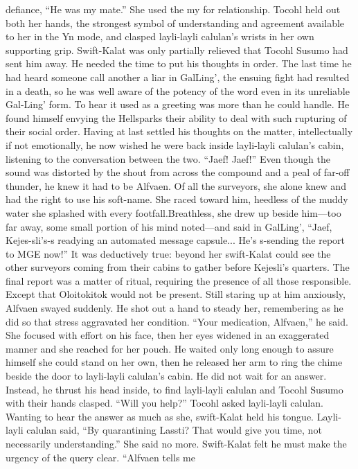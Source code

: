 \documentclass[9pt]{article}
\begin{document}
defiance, “He was my mate.” She used the my for relationship.
Tocohl held out both her hands, the strongest symbol of understanding and agreement available to
her in the Yn mode, and clasped layli-layli calulan’s wrists in her own supporting grip.
Swift-Kalat was only partially relieved that Tocohl Susumo had sent him away. He needed the time
to put his thoughts in order. The last time he had heard someone call another a liar in GalLing’, the
ensuing fight had resulted in a death, so he was well aware of the potency of the word even in its
unreliable Gal-Ling’ form. To hear it used as a greeting was more than he could handle. He found himself
envying the Hellsparks their ability to deal with such rupturing of their social order. Having at last settled
his thoughts on the matter, intellectually if not emotionally, he now wished he were back inside layli-layli
calulan’s cabin, listening to the conversation between the two.
“Jaef! Jaef!”
Even though the sound was distorted by the shout from across the compound and a peal of far-off
thunder, he knew it had to be Alfvaen. Of all the surveyors, she alone knew and had the right to use his
soft-name. She raced toward him, heedless of the muddy water she splashed with every footfall.Breathless, she drew up beside him—too far away, some small portion of his mind noted—and said
in GalLing’, “Jaef, Kejes-sli’s-s readying an automated message capsule... He’s s-sending the report to
MGE now!”
It was deductively true: beyond her swift-Kalat could see the other surveyors coming from their
cabins to gather before Kejesli’s quarters. The final report was a matter of ritual, requiring the presence
of all those responsible. Except that Oloitokitok would not be present.
Still staring up at him anxiously, Alfvaen swayed suddenly. He shot out a hand to steady her,
remembering as he did so that stress aggravated her condition. “Your medication, Alfvaen,” he said. She
focused with effort on his face, then her eyes widened in an exaggerated manner and she reached for her
pouch. He waited only long enough to assure himself she could stand on her own, then he released her
arm to ring the chime beside the door to layli-layli calulan’s cabin.
He did not wait for an answer. Instead, he thrust his head inside, to find layli-layli calulan and
Tocohl Susumo with their hands clasped.
“Will you help?” Tocohl asked layli-layli calulan. Wanting to hear the answer as much as she,
swift-Kalat held his tongue. Layli-layli calulan said, “By quarantining Lassti? That would give you time,
not necessarily understanding.”
She said no more. Swift-Kalat felt he must make the urgency of the query clear. “Alfvaen tells me
\end{document}
